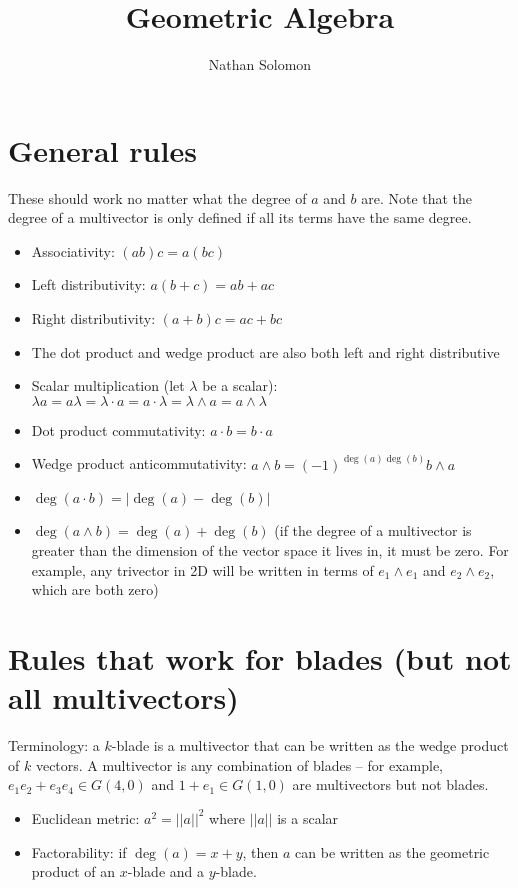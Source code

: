\documentclass[12pt]{article}
\begin{document}
\title{Geometric Algebra}
\author{Nathan Solomon}
\maketitle

\section{General rules}
These should work no matter what the degree of $a$ and $b$ are. Note that the degree of a multivector is only defined if all its terms have the same degree.
\begin{itemize}
    \item Associativity: $(ab)c = a(bc)$
    \item Left distributivity: $a(b+c) = ab+ac$
    \item Right distributivity: $(a+b)c = ac+bc$
    \item The dot product and wedge product are also both left and right distributive
    \item Scalar multiplication (let $\lambda$ be a scalar): $\lambda a = a \lambda = \lambda \cdot a = a \cdot \lambda = \lambda \wedge a = a \wedge \lambda$
    \item Dot product commutativity: $a \cdot b = b \cdot a$
    \item Wedge product anticommutativity: $a \wedge b = (-1)^{\deg(a) \deg(b)} b \wedge a$
    \item $\deg(a \cdot b) = | \deg(a) - \deg(b) |$
    \item $\deg(a \wedge b) = \deg(a) + \deg(b)$ (if the degree of a multivector is greater than the dimension of the vector space it lives in, it must be zero. For example, any trivector in 2D will be written in terms of $e_1 \wedge e_1$ and $e_2 \wedge e_2$, which are both zero)
\end{itemize}

\section{Rules that work for blades (but not all multivectors)}
Terminology: a $k$-blade is a multivector that can be written as the wedge product of $k$ vectors. A multivector is any combination of blades -- for example, $e_1 e_2 + e_3 e_4 \in G(4,0)$ and $1 + e_1 \in G(1,0)$ are multivectors but not  blades.

\begin{itemize}
    \item Euclidean metric: $a^2 = ||a||^2$ where $||a||$ is a scalar
    \item Factorability: if $\deg(a) = x + y$, then $a$ can be written as the geometric product of an $x$-blade and a $y$-blade.
\end{itemize}
\end{document}
